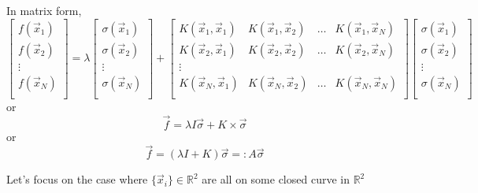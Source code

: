 In matrix form,
\begin{equation*}
    \begin{bmatrix}
        f(\vec{x}_1) \\
        f(\vec{x}_2) \\
        \vdots \\
        f(\vec{x}_N) \\
    \end{bmatrix}
    =\lambda
    \begin{bmatrix}
        \sigma(\vec{x}_1) \\
       \sigma(\vec{x}_2) \\
        \vdots \\
        \sigma(\vec{x}_N) \\
    \end{bmatrix}
    +
    \begin{bmatrix}
    K(\vec{x}_1, \vec{x}_1) & K(\vec{x}_1, \vec{x}_2) & \ldots &K(\vec{x}_1, \vec{x}_N)\\
    K(\vec{x}_2, \vec{x}_1) & K(\vec{x}_2, \vec{x}_2) & \ldots &K(\vec{x}_2, \vec{x}_N)\\
    \vdots\\
    K(\vec{x}_N, \vec{x}_1) & K(\vec{x}_N, \vec{x}_2) & \ldots &K(\vec{x}_N, \vec{x}_N)\\
    \end{bmatrix}
    \begin{bmatrix}
        \sigma(\vec{x}_1) \\
       \sigma(\vec{x}_2) \\
        \vdots \\
        \sigma(\vec{x}_N) \\
    \end{bmatrix}
\end{equation*}
or
\begin{equation*}
    \vec{f} = \lambda I \vec{\sigma} + K \times \vec{\sigma}
\end{equation*}
or
\begin{equation*}
    \vec{f} = \left( \lambda I + K \right) \vec{\sigma} =: A\vec{\sigma}
\end{equation*}


Let's focus on the case where $\{\vec{x}_i\}\in\mathbb{R}^2$ are all on some closed curve in $\mathbb{R}^2$
\begin{center}
    
\end{center}
\begin{center}
    
\end{center}
\begin{center}
    
\end{center}

